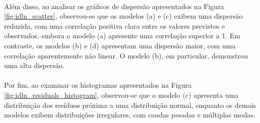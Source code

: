 \paragraph{} Além disso, ao analisar os gráficos de dispersão apresentados na Figura \ref{fig:idln_scatter}, observou-se que os modelos (a) e (c) exibem uma dispersão reduzida, com uma correlação positiva clara entre os valores previstos e observados, embora o modelo (a) apresente uma correlação superior a 1. Em contraste, os modelos (b) e (d) apresentam uma dispersão maior, com uma correlação aparentemente não linear. O modelo (b), em particular, demonstrou uma alta dispersão.
\paragraph{} Por fim, ao examinar os histogramas apresentados na Figura \ref{fig:idln_residuals_histogram}, observou-se que o modelo (c) apresenta uma distribuição dos resíduos próxima a uma distribuição normal, enquanto os demais modelos exibem distribuições irregulares, com caudas pesadas e múltiplas modas.

